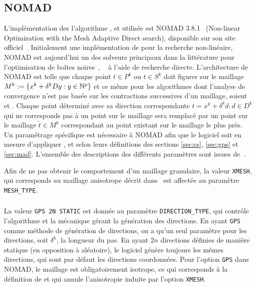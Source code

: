 \subsection{NOMAD}\label{sec:nom}
L'implémentation des l'algorithme \CS, \GPS et \MADS utilisée est NOMAD 3.8.1~\cite{Le09b} (Non-linear Optimization with the Mesh Adaptive Direct search), disponible sur son site officiel~\cite{AuCo04a}. Initialement une implémentation de \MADS pour la recherche non-linéaire, NOMAD est aujourd'hui un des solveurs principaux dans la littérature pour l'optimisation de boîtes noires~\cite{CoScVibook}, ~\cite{RiSa2010} à l'aide de recherche directe. L'architecture de NOMAD est telle que chaque point $t \in P^k$ ou $t \in S^k$ doit figurer sur le maillage $M^k:=\{x^k+\delta^kDy:y\in \mathbb{N}^p\}$ et ce même pour les algorithmes dont l'analyse de convergence n'est pas basée sur les contractions successives d'un maillage, soient \CS et \GPS. Chaque point déterminé avec sa direction correspondante $t = x^k + \delta^k d : d \in D^k$ qui ne corresponds pas à un point sur le maillage sera remplacé par un point sur le maillage $\tilde{t} \in M^k$ correspondant au point existant sur le maillage le plus près. Un paramétrage spécifique est nécessaire à NOMAD afin que le logiciel soit en mesure d'appliquer \CS, \GPS et \MADS selon leurs définitions des sections \ref{sec:cs}, \ref{sec:gps} et \ref{sec:mad}. L'ensemble des descriptions des différents paramètres sont issues de~\cite{Le09a}.   
  
Afin de ne pas obtenir le comportement d'un maillage granulaire, la valeur \texttt{XMESH}, qui corresponds au maillage anisotrope décrit dans~\cite{AuLedTr2014} est affectée au paramètre \texttt{MESH\_TYPE}.
\subsubsection{\CS}\label{sec:ncs}
La valeur \texttt{GPS 2N STATIC} est donnée au paramètre \texttt{DIRECTION\_TYPE}, qui contrôle l'algorithme et la mécanique gérant la génération des directions. En ayant \texttt{GPS} comme méthode de génération de directions, on a qu'un seul paramètre pour les directions, soit $\delta^k$, la longueur du pas. En ayant $2n$ directions définies de manière statique (en opposition à aléatoire), le logiciel génère toujours les mêmes directions, qui sont par défaut les directions coordonnées. Pour l'option \texttt{GPS} dans NOMAD, le maillage est obligatoirement isotrope, ce qui corresponds à la définition de \CS et qui annule l'anisotropie induite par l'option \texttt{XMESH}. 
 
